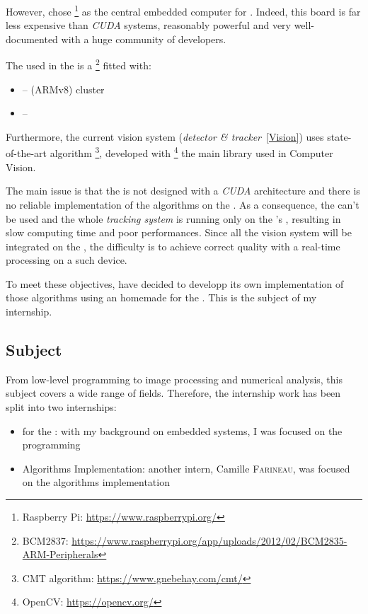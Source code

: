 However, \groupname{} chose \rasp\footnote{Raspberry Pi: \url{https://www.raspberrypi.org/}} as the central embedded computer for \iBubble. Indeed, this board is far less expensive than \emph{CUDA} systems, reasonably powerful and very well-documented with a huge community of developers.\par

The  used in the \rasp{} is a  \bcm{}\footnote{BCM2837: \url{https://www.raspberrypi.org/app/uploads/2012/02/BCM2835-ARM-Peripherals}} fitted with:
\begin{itemize}
\item {} --  (ARMv8) cluster
\item {} -- \vc{}
\end{itemize}

Furthermore, the current vision system (\emph{detector \& tracker}~\ref{Vision}) uses state-of-the-art algorithm \footnote{CMT algorithm: \url{https://www.gnebehay.com/cmt/}}, developed with \footnote{OpenCV: \url{https://opencv.org/}} the main library used in Computer Vision.

The main issue is that the \bcm{} is not designed with a \emph{CUDA} architecture and there is no reliable implementation of the algorithms on the \rasp. As a consequence, the \vc{} can't be used and the whole \emph{tracking system} is running only on the \rasp's , resulting in slow computing time and poor performances. Since all the vision system will be integrated on the \rasp, the difficulty is to achieve correct quality with a real-time processing on a such device.

To meet these objectives, \groupname{} have decided to developp its own implementation of those algorithms using an homemade  for the \vc. This is the subject of my internship.


\subsection{Subject}

From low-level programming to image processing and numerical analysis, this subject covers a wide range of fields. Therefore, the internship work has been split into two internships:

\begin{itemize}
\item {} for the : with my background on embedded systems, I was focused on the \vc{} programming
\item Algorithms Implementation: another intern, Camille \textsc{Farineau}, was focused on the  algorithms implementation
\end{itemize}


